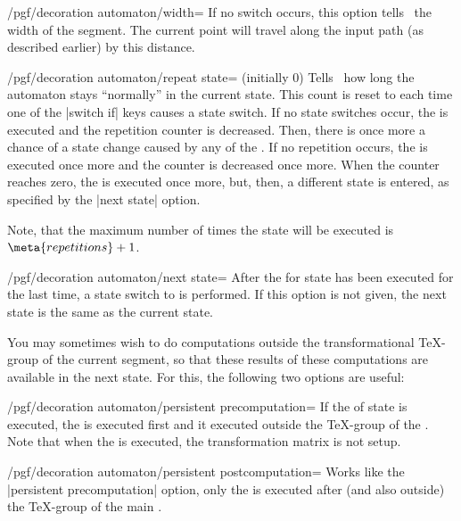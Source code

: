 \begin{command}{\pgfdeclaredecoration{}}
\begin{command}{\state{}}
\begin{key}{/pgf/decoration automaton/width=}
      If no switch occurs, this option tells \pgfname\ the width of
      the segment. The current point will travel along the input path
      (as described earlier)   by this distance.
    \end{key}
    \begin{key}{/pgf/decoration automaton/repeat state= (initially 0)}
      Tells \pgfname\ how long the automaton stays ``normally'' in the
      current state. This count is reset to  each
      time one of the |switch if| keys causes a state switch. If no
      state switches occur, the  is executed and the
      repetition counter is decreased. Then, there is once more a
      chance of a state change caused by any of the . If
      no repetition occurs, the  is executed 
      once more and the counter is decreased once more. When the
      counter reaches zero, the  is executed once more,
      but, then, a different state is entered, as specified by the
      |next state| option.

      Note, that the maximum number of times the state will be executed 
      is $\meta{repetitions}+1$.
    \end{key}
    \begin{key}{/pgf/decoration automaton/next state=}
      After the  for state has been executed for the last
      time, a state switch to  is performed. If this
      option is not given, the next state is the same as the current state.
    \end{key}

    You may sometimes wish to do computations outside the
    transformational \TeX-group of the current segment,
    so that these results of these computations are available in the
    next state. For this, the following two options are useful:
    
    \begin{key}{/pgf/decoration automaton/persistent precomputation=}
      If the  of state is executed, the  is
      executed first and it executed outside the \TeX-group of the
      . Note that when the  is executed, the
      transformation matrix is not setup.
    \end{key}

    \begin{key}{/pgf/decoration automaton/persistent postcomputation=}
      Works like the |persistent precomputation| option, only the
       is executed after (and also outside) the
      \TeX-group of the main .
    \end{key}
    

\end{command}
\end{command}
